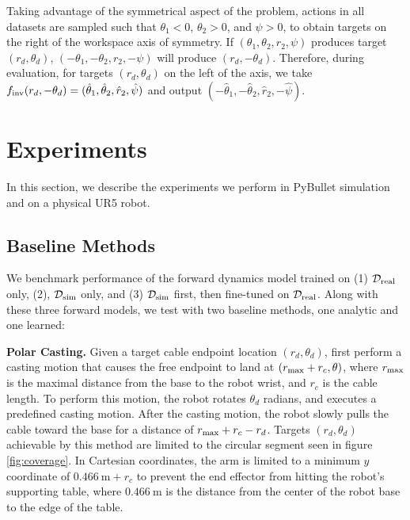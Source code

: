 \documentclass[letterpaper, 10 pt, conference]{ieeeconf}  %
\newcommand{\remark}[3]{{\color{#2}[#1: #3]}}
\newcommand{\jeffi}[1]{\remark{JI}{red}{#1}}
\begin{document}
Taking advantage of the symmetrical aspect of the problem, actions in all datasets are sampled such that $\theta_1 < 0$, $\theta_2 > 0$, and $\psi > 0$, to obtain targets on the right of the workspace axis of symmetry. If $(\theta_1, \theta_2, r_2, \psi)$ produces target $(r_d, \theta_d)$, $(-\theta_1, -\theta_2, r_2, -\psi)$ will produce $(r_d, -\theta_d)$. Therefore, during evaluation, for targets $(r_d, \theta_d)$ on the left of the axis, we take $f_{\rm inv}(r_d, -\theta_d) = (\hat{\theta}_1, \hat{\theta}_2, \hat{r}_2, \hat{\psi})$ and output $(-\hat{\theta}_1, -\hat{\theta}_2, \hat{r}_2, -\hat{\psi})$.



\section{Experiments}\label{sec:experiments}

In this section, we describe the experiments we perform in PyBullet simulation and on a physical UR5 robot.

\subsection{Baseline Methods}\label{ssection:methods}

We benchmark performance of the forward dynamics model trained on (1) $\mathcal{D}_{\rm real}$ only, (2), $\mathcal{D}_{\rm sim}$ only, and (3)  $\mathcal{D}_{\rm sim}$ first, then fine-tuned on $\mathcal{D}_{\rm real}$. Along with these three forward models, we test with two baseline methods, one analytic and one learned:

\textbf{Polar Casting.} Given a target cable endpoint location $(r_d, \theta_d)$, first perform a casting motion that causes the free endpoint to land at $(r_{\rm max} + r_c, \theta)$, where $r_{\rm max}$ is the maximal distance from the base to the robot wrist, and $r_c$ is the cable length. To perform this motion, the robot rotates $\theta_d$ radians, and executes a predefined casting motion. After the casting motion, the robot slowly pulls the cable toward the base for a distance of $r_{\rm max} + r_c - r_d$. Targets $(r_d, \theta_d)$ achievable by this method are limited to the circular segment seen in figure \ref{fig:coverage}. In Cartesian coordinates, the arm is limited to a minimum $y$ coordinate of $\SI{0.466}{\meter}+r_c$ to prevent the end effector from hitting the robot's supporting table, where $\SI{0.466}{\meter}$ is the distance from the center of the robot base to the edge of the table. 
\end{document}
